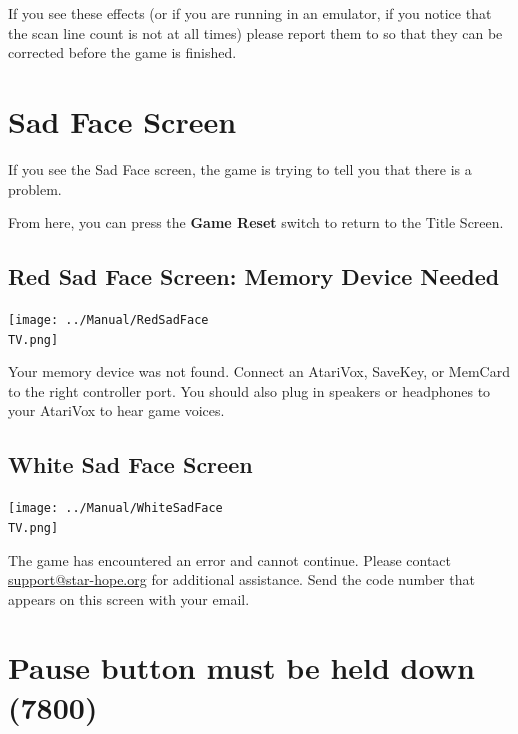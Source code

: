 \documentclass[10pt,twocolumn,openany,article]{memoir}
\newcommand\TV{NTSC}
\newcommand\TV{PAL}
\newcommand\TV{SECAM}
\begin{document}
If you see these  effects (or if you are running in  an emulator, if you
notice that the  scan line count is not \ifdefined{} 
\fi      at     all      times)      please      report     them      to
 so  that they
can be corrected before the game is finished.

\fi

\section{Sad Face Screen}

If you  see the Sad  Face screen,  the game is  trying to tell  you that
there is a problem.

From here, you can press the \textbf{Game Reset} switch to return to the
Title Screen.

\ifdefined\ATARIAGESAVE\else\ifdefined\NOSAVE\else

\subsection{Red Sad Face Screen: Memory Device Needed}

\texttt{[image: ../Manual/RedSadFace\\TV.png]}

Your  memory device  was not  found.  Connect an  AtariVox, SaveKey,  or
MemCard to the  right controller port. You should also  plug in speakers
or headphones to your AtariVox to hear game voices.

\fi\fi

\subsection{White Sad Face Screen}

\texttt{[image: ../Manual/WhiteSadFace\\TV.png]}

The game  has encountered an  error and cannot continue.  Please contact
\href{mailto:support@star-hope.org}{support@star-hope.org}           for
additional assistance. Send the code  number that appears on this screen
with your email.

\ifdefined\ATARIAGESAVE\else

\section{Pause button must be held down (7800)}
\end{document}
